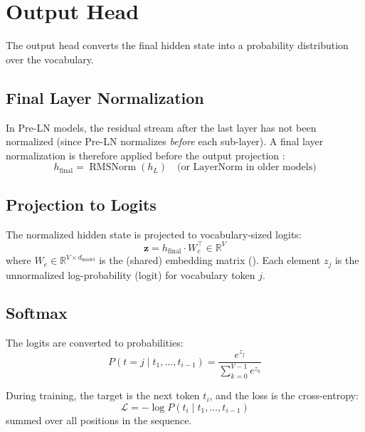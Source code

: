\documentclass[11pt,a4paper]{article}
\newcommand{\R}{\mathbb{R}}
\newcommand{\RMSNorm}{\operatorname{RMSNorm}}
\newcommand{\dmodel}{d_{\text{model}}}
\begin{document}
\section{Output Head}
\label{sec:output-head}

The output head converts the final hidden state into a probability distribution over the
vocabulary.

\subsection{Final Layer Normalization}

In Pre-LN models, the residual stream after the last layer has not been normalized (since
Pre-LN normalizes \emph{before} each sub-layer). A final layer normalization is therefore
applied before the output projection \cite{xiong2020}:
\begin{equation}
  h_{\text{final}} = \RMSNorm(h_L) \quad \text{(or LayerNorm in older models)}
\end{equation}

\subsection{Projection to Logits}

The normalized hidden state is projected to vocabulary-sized logits:
\begin{equation}
  \bm{z} = h_{\text{final}} \cdot W_e^\top \in \R^V
\end{equation}
where $W_e \in \R^{V \times \dmodel}$ is the (shared) embedding matrix
(). Each element $z_j$ is the unnormalized log-probability
(logit) for vocabulary token $j$.

\subsection{Softmax}

The logits are converted to probabilities:
\begin{equation}
  P(t = j \mid t_1, \ldots, t_{i-1}) = \frac{e^{z_j}}{\sum_{k=0}^{V-1} e^{z_k}}
\end{equation}

During training, the target is the next token $t_i$, and the loss is the cross-entropy:
\begin{equation}
  \mathcal{L} = -\log P(t_i \mid t_1, \ldots, t_{i-1})
\end{equation}
summed over all positions in the sequence.
\end{document}
